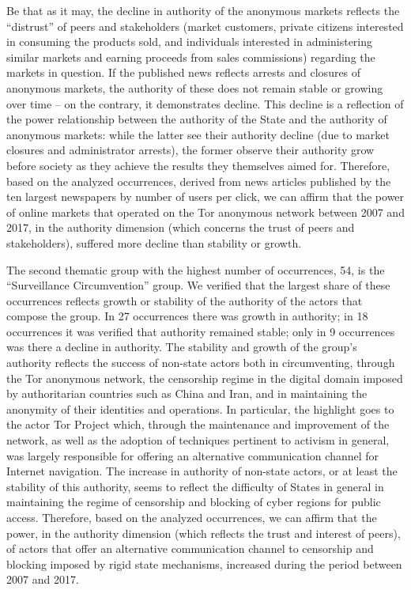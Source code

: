 Be that as it may, the decline in authority of the anonymous markets reflects the ``distrust'' of peers and stakeholders (market customers, private citizens interested in consuming the products sold, and individuals interested in administering similar markets and earning proceeds from sales commissions) regarding the markets in question. If the published news reflects arrests and closures of anonymous markets, the authority of these does not remain stable or growing over time -- on the contrary, it demonstrates decline. This decline is a reflection of the power relationship between the authority of the State and the authority of anonymous markets: while the latter see their authority decline (due to market closures and administrator arrests), the former observe their authority grow before society as they achieve the results they themselves aimed for. Therefore, based on the analyzed occurrences, derived from news articles published by the ten largest newspapers by number of users per click, we can affirm that the power of online markets that operated on the Tor anonymous network between 2007 and 2017, in the authority dimension (which concerns the trust of peers and stakeholders), suffered more decline than stability or growth.

The second thematic group with the highest number of occurrences, 54, is the ``Surveillance Circumvention'' group. We verified that the largest share of these occurrences reflects growth or stability of the authority of the actors that compose the group. In 27 occurrences there was growth in authority; in 18 occurrences it was verified that authority remained stable; only in 9 occurrences was there a decline in authority. The stability and growth of the group's authority reflects the success of non-state actors both in circumventing, through the Tor anonymous network, the censorship regime in the digital domain imposed by authoritarian countries such as China and Iran, and in maintaining the anonymity of their identities and operations. In particular, the highlight goes to the actor Tor Project which, through the maintenance and improvement of the network, as well as the adoption of techniques pertinent to activism in general, was largely responsible for offering an alternative communication channel for Internet navigation. The increase in authority of non-state actors, or at least the stability of this authority, seems to reflect the difficulty of States in general in maintaining the regime of censorship and blocking of cyber regions for public access. Therefore, based on the analyzed occurrences, we can affirm that the power, in the authority dimension (which reflects the trust and interest of peers), of actors that offer an alternative communication channel to censorship and blocking imposed by rigid state mechanisms, increased during the period between 2007 and 2017.


